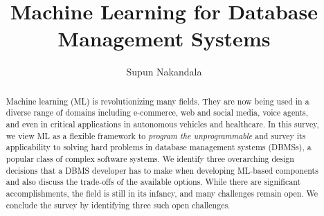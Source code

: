 \documentclass[sigconf, 10pt]{acmart}
\newcommand{\titlename}{Machine Learning for Database Management Systems}
\begin{document}
\sloppy
\title{\titlename}

\author{Supun Nakandala}


\begin{abstract}
Machine learning (ML) is revolutionizing many fields.
They are now being used in a diverse range of domains including e-commerce, web and social media, voice agents, and even in critical applications in autonomous vehicles and healthcare.
In this survey, we view ML as a flexible framework to \textit{program the unprogrammable} and survey its applicability to solving hard problems in database management systems (DBMSs), a popular class of complex software systems.
We identify three overarching design decisions that a DBMS developer has to make when developing ML-based components and also discuss the trade-offs of the available options.
While there are significant accomplishments, the field is still in its infancy, and many challenges remain open.
We conclude the survey by identifying three such open challenges.
\end{abstract}

\maketitle













\balance

\end{document}
